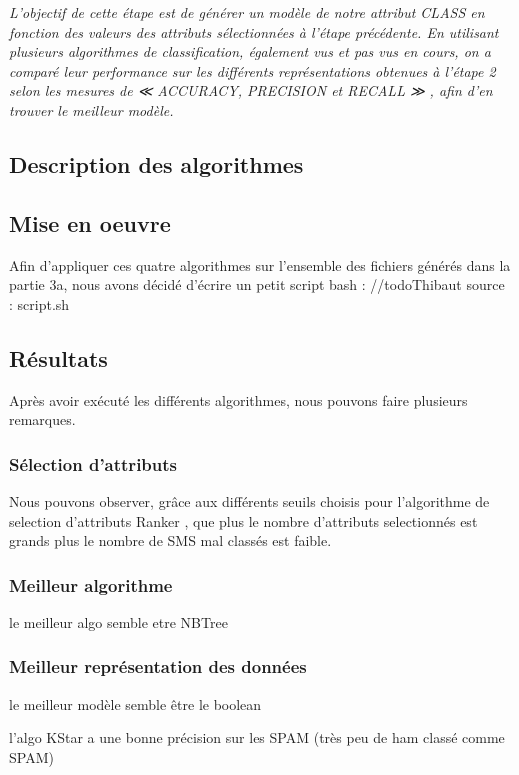 \textit{L’objectif de cette étape est de générer un modèle de notre attribut CLASS en fonction des valeurs des attributs sélectionnées à l’étape précédente. En utilisant plusieurs algorithmes de classification, également vus et pas vus en cours, on a comparé leur performance sur les différents représentations obtenues à l’étape 2 selon les mesures de ≪ ACCURACY, PRECISION et RECALL ≫ , afin d’en trouver le meilleur modèle.}

\subsection{Description des algorithmes}


\subsection{Mise en oeuvre}

Afin d'appliquer ces quatre algorithmes sur l'ensemble des fichiers générés dans la partie 3a, nous avons décidé d'écrire un petit script bash :
//todo{Thibaut} source : script.sh

\subsection{Résultats}

Après avoir exécuté les différents algorithmes, nous pouvons faire plusieurs remarques.

\subsubsection{Sélection d'attributs}
Nous pouvons observer, grâce aux différents seuils choisis pour l'algorithme de selection d'attributs \og Ranker \fg{}, que plus le nombre d'attributs selectionnés est grands plus le nombre de SMS mal classés est faible.

\subsubsection{Meilleur algorithme}
    le meilleur algo semble etre NBTree

\subsubsection{Meilleur représentation des données}
    le meilleur modèle semble être le boolean 

    l'algo KStar a une bonne précision sur les SPAM (très peu de ham classé comme SPAM)



